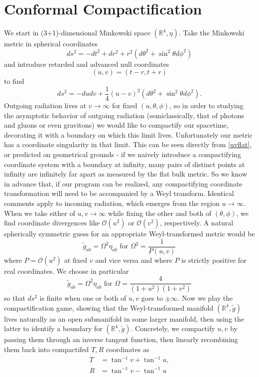 \documentclass[11pt,letterpaper]{article}
\newcommand{\mc}[1]{\mathcal{#1}}
\newcommand{\R}{\mathbb{R}}
\begin{document}
\section{Conformal Compactification}
We start in (3+1)-dimensional Minkowski space $(\R^4, \eta)$. Take the Minkowski metric in spherical coordinates \begin{equation}
ds^2 = - dt^2 + dr^2 + r^2 (d \theta^2 + \sin^2 \theta d \phi^2)
\end{equation}
and introduce retarded and advanced null coordinates \begin{equation}
(u,v) = (t - r, t + r)
\end{equation}
to find \begin{equation}\label{uvflat}
ds^2 = - du dv + \frac{1}{4} (u-v)^2 (d \theta^2 + \sin^2 \theta d \phi^2).
\end{equation}
Outgoing radiation lives at $v \to \infty$ for fixed $(u,\theta, \phi)$, so in order to studying the asymptotic behavior of outgoing radiation (semiclassically, that of photons and gluons or even gravitons) we would like to compactify our spacetime, decorating it with a boundary on which this limit lives. Unfortunately our metric has a coordinate singularity in that limit. This can be seen directly from \eqref{uvflat}, or predicted on geometrical grounds - if we naively introduce a compactifying coordinate system with a boundary at infinity, many pairs of distinct points at infinity are infinitely far apart as measured by the flat bulk metric. So we know in advance that, if our program can be realized, any compactifying coordinate transformation will need to be accompanied by a Weyl transform. Identical comments apply to incoming radiation, which emerges from the region $u \to \infty$. When we take either of $u, v \to \infty$ while fixing the other and both of $(\theta, \phi)$, we find coordinate divergences like $\mathcal{O}(u^2)$ or $\mathcal{O}(v^2)$, respectively. A natural spherically symmetric guess for an appropriate Weyl-transformed metric would be \begin{equation}
\tilde{g}_{ab} = \Omega^2 \eta_{ab} \mbox{ for } \Omega^2 = \frac{1}{P(u,v)}
\end{equation}
where $P = \mc{O}(u^2)$ at fixed $v$ and vice versa and where $P$ is strictly positive for real coordinates. We choose in particular \begin{equation}
\tilde{g}_{ab} = \Omega^2 \eta_{ab} \mbox{ for } \Omega = \frac{4}{(1 + u^2)(1 + v^2)}
\end{equation}
so that $ds^2$ is finite when one or both of $u,v$ goes to $\pm \infty$. Now we play the compactification game, showing that the Weyl-transformed manifold $(\R^4, \tilde{g})$ lives naturally as an open submanifold in some larger manifold, then using the latter to identify a boundary for $(\R^4, \tilde{g})$. Concretely, we compactify $u,v$ by passing them through an inverse tangent function, then linearly recombining them back into compactifed $T,R$ coordinates as \begin{equation}
\begin{aligned}
T & = \tan^{-1} v + \tan^{-1} u, \\
R & = \tan^{-1} v - \tan^{-1} u
\end{aligned}
\end{equation}
\end{document}
